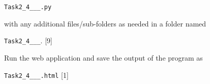 \texttt{Task2\_4\_<your name>\_<center number>\_<index number>.py }

with any additional files/sub-folders as needed in a folder named 

\texttt{Task2\_4\_<your name>\_<center number>\_<index number>}.\hfill{}
{[}9{]}

Run the web application and save the output of the program as 

\texttt{Task2\_4\_<your name>\_<center number>\_<index number>.html}\hfill{}
{[}1{]}